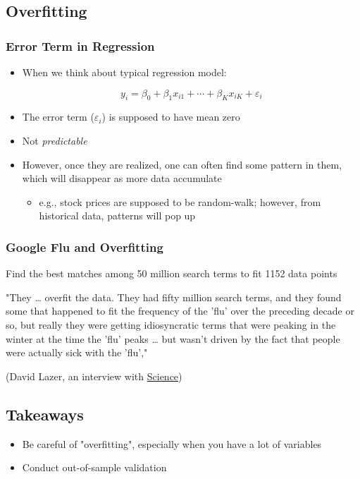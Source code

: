 \documentclass[10pt,article]{article}
\begin{document}
\subsection{Overfitting}
\label{sec:org7810a29}
\subsubsection{Error Term in Regression}
\label{sec:org60ce889}
\begin{itemize}
\item When we think about typical regression model:

\[ y_{i} = \beta_{0} + \beta_{1}x_{i1} + \cdots + \beta_{K}x_{iK} + \varepsilon_{i} \]

\item The error term (\(\varepsilon_{i}\)) is supposed to have mean zero
\item Not \emph{predictable}
\item However, once they are realized, one can often find some pattern in them,
which will disappear as more data accumulate
\begin{itemize}
\item e.g., stock prices are supposed to be random-walk; however, from historical data, 
patterns will pop up
\end{itemize}
\end{itemize}
\subsubsection{Google Flu and Overfitting}
\label{sec:orgd66050a}
Find the best matches among 50 million search terms to fit 1152 data points

"They \ldots{} overfit the data. They had fifty million search terms, and they
found some that happened to fit the frequency of the 'flu' over the
preceding decade or so, but really they were getting idiosyncratic terms
that were peaking in the winter at the time the 'flu' peaks \ldots{} but wasn't
driven by the fact that people were actually sick with the 'flu',"

(David Lazer, an interview with \href{http://www.sciencemag.org/content/343/6176/1270.2.full}{Science})
\subsection{Takeaways}
\label{sec:org36d6d1f}
\begin{itemize}
\item Be careful of "overfitting", especially when you have a lot of variables
\item Conduct out-of-sample validation
\end{itemize}
\end{document}
